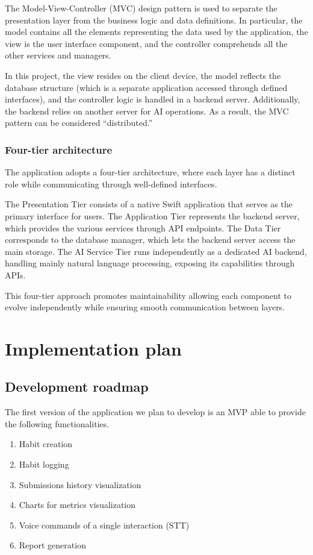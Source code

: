 \documentclass{article}
\begin{document}
The Model-View-Controller (MVC) design pattern is used to separate the presentation layer from the business logic and data definitions.
In particular, the model contains all the elements representing the data used by the application, the view is the user interface component, and the controller comprehends all the other services and managers.

In this project, the view resides on the client device, the model reflects the database structure (which is a separate application accessed through defined interfaces), and the controller logic is handled in a backend server.
Additionally, the backend relies on another server for AI operations.
As a result, the MVC pattern can be considered “distributed.”

\subsubsection{Four-tier architecture}

The application adopts a four-tier architecture, where each layer has a distinct role while communicating through well-defined interfaces.

The Presentation Tier consists of a native Swift application that serves as the primary interface for users.
The Application Tier represents the backend server, which provides the various services through API endpoints.
The Data Tier corresponds to the database manager, which lets the backend server access the main storage.
The AI Service Tier runs independently as a dedicated AI backend, handling mainly natural language processing, exposing its capabilities through APIs.

This four-tier approach promotes maintainability allowing each component to evolve independently while ensuring smooth communication between layers.

\newpage
\section{Implementation plan}

\subsection{Development roadmap}

The first version of the application we plan to develop is an MVP able to provide the following functionalities.

\begin{enumerate}
	\item Habit creation
	\item Habit logging
	\item Submissions history visualization
	\item Charts for metrics visualization
	\item Voice commands of a single interaction (STT)
	\item Report generation
\end{enumerate}
\end{document}
